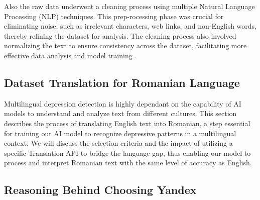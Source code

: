 Also the raw data underwent a cleaning process using multiple Natural Language Processing (NLP) techniques. This prep-rocessing phase was crucial for eliminating noise, such as irrelevant characters, web links, and non-English words, thereby refining the dataset for analysis. The cleaning process also involved normalizing the text to ensure consistency across the dataset, facilitating more effective data analysis and model training \cite{depressionDataset}.

\subsection{Dataset Translation for Romanian Language}
\par \quad Multilingual depression detection is highly dependant on the capability of AI models to understand and analyze text from different cultures. This section describes the process of translating English text into Romanian, a step essential for training our AI model to recognize depressive patterns in a multilingual context. We will discuss the selection criteria and the impact of utilizing a specific Translation API to bridge the language gap, thus enabling our model to process and interpret Romanian text with the same level of accuracy as English. 

\subsection{Reasoning Behind Choosing Yandex}

